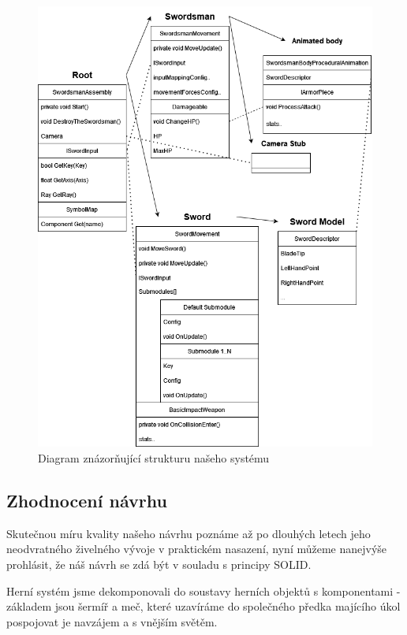 \begin{figure}[ht]\centering
    \center
    \includegraphics[width=145mm]{../img/Structure-diagram.png}
    \caption{Diagram znázorňující strukturu našeho systému}
    \label{obr04:diagram}
\end{figure} 

\subsection{Zhodnocení návrhu} 

Skutečnou míru kvality našeho návrhu poznáme až po dlouhých letech jeho neodvratného živelného vývoje v praktickém nasazení, nyní můžeme nanejvýše prohlásit, že náš návrh se zdá být v souladu s principy SOLID. 

Herní systém jsme dekomponovali do soustavy herních objektů s komponentami - základem jsou šermíř a meč, které uzavíráme do společného předka majícího úkol pospojovat je navzájem a s vnějším světěm. 

